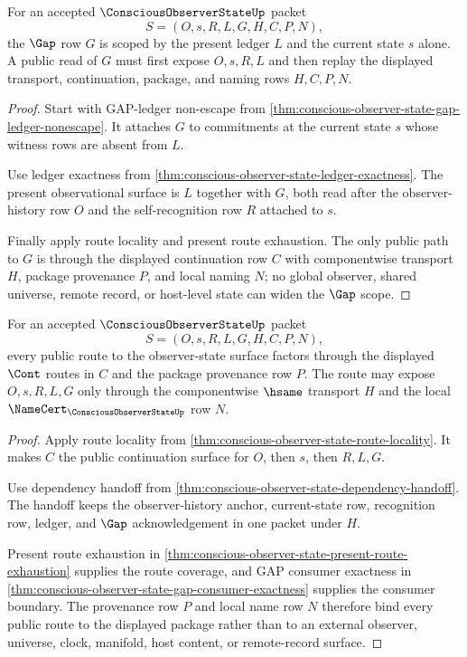 \begin{theorem}
\label{thm:conscious-observer-state-gap-scope-binding}
For an accepted $\ConsciousObserverStateUp$ packet
$$
S=(O,s,R,L,G,H,C,P,N),
$$
the $\Gap$ row $G$ is scoped by the present ledger $L$ and the current state $s$ alone. A public read of $G$ must first expose $O,s,R,L$ and then replay the displayed transport, continuation, package, and naming rows $H,C,P,N$.
\end{theorem}
\begin{proof}
Start with GAP-ledger non-escape from \autoref{thm:conscious-observer-state-gap-ledger-nonescape}. It attaches $G$ to commitments at the current state $s$ whose witness rows are absent from $L$.

Use ledger exactness from \autoref{thm:conscious-observer-state-ledger-exactness}. The present observational surface is $L$ together with $G$, both read after the observer-history row $O$ and the self-recognition row $R$ attached to $s$.

Finally apply route locality and present route exhaustion. The only public path to $G$ is through the displayed continuation row $C$ with componentwise transport $H$, package provenance $P$, and local naming $N$; no global observer, shared universe, remote record, or host-level state can widen the $\Gap$ scope.
\end{proof}

\begin{theorem}
\label{thm:conscious-observer-state-route-scope-package}
For an accepted $\ConsciousObserverStateUp$ packet
$$
S=(O,s,R,L,G,H,C,P,N),
$$
every public route to the observer-state surface factors through the displayed $\Cont$ routes in $C$ and the package provenance row $P$. The route may expose $O,s,R,L,G$ only through the componentwise $\hsame$ transport $H$ and the local $\NameCert_{\ConsciousObserverStateUp}$ row $N$.
\end{theorem}
\begin{proof}
Apply route locality from \autoref{thm:conscious-observer-state-route-locality}. It makes $C$ the public continuation surface for $O$, then $s$, then $R,L,G$.

Use dependency handoff from \autoref{thm:conscious-observer-state-dependency-handoff}. The handoff keeps the observer-history anchor, current-state row, recognition row, ledger, and $\Gap$ acknowledgement in one packet under $H$.

Present route exhaustion in \autoref{thm:conscious-observer-state-present-route-exhaustion} supplies the route coverage, and GAP consumer exactness in \autoref{thm:conscious-observer-state-gap-consumer-exactness} supplies the consumer boundary. The provenance row $P$ and local name row $N$ therefore bind every public route to the displayed package rather than to an external observer, universe, clock, manifold, host content, or remote-record surface.
\end{proof}

